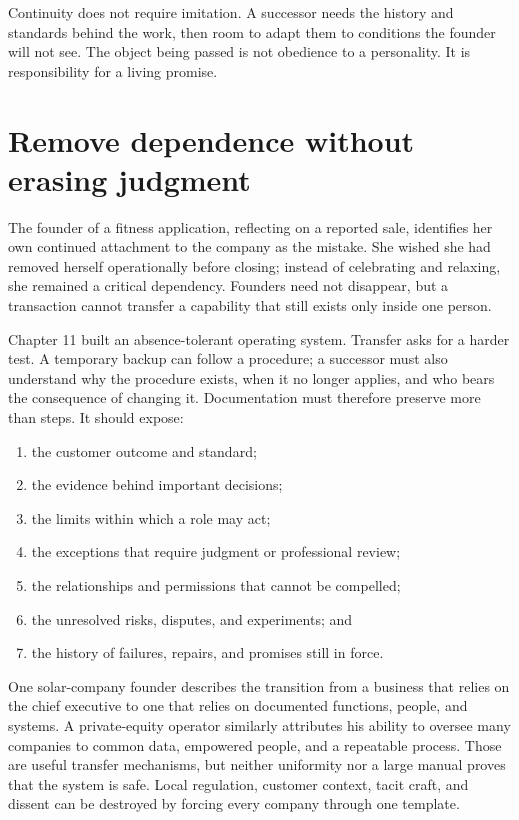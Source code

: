 Continuity does not require imitation. A successor needs the history and
standards behind the work, then room to adapt them to conditions the founder
will not see. The object being passed is not obedience to a personality. It is
responsibility for a living promise.

\section{Remove dependence without erasing judgment}

The founder of a fitness application, reflecting on a reported sale, identifies
her own continued attachment to the company as the mistake. She wished she had
removed herself operationally before closing; instead of celebrating and
relaxing, she remained a critical dependency. Founders need not disappear, but
a transaction cannot transfer a capability that still exists only inside one
person.

Chapter 11 built an absence-tolerant operating system. Transfer asks for a
harder test. A temporary backup can follow a procedure; a successor must also
understand why the procedure exists, when it no longer applies, and who bears
the consequence of changing it. Documentation must therefore preserve more
than steps. It should expose:

\begin{enumerate}[itemsep=0.12em]
\item the customer outcome and standard;
\item the evidence behind important decisions;
\item the limits within which a role may act;
\item the exceptions that require judgment or professional review;
\item the relationships and permissions that cannot be compelled;
\item the unresolved risks, disputes, and experiments; and
\item the history of failures, repairs, and promises still in force.
\end{enumerate}

One solar-company founder describes the transition from a business that relies
on the chief executive to one that relies on documented functions, people, and
systems. A private-equity operator similarly attributes his ability to oversee
many companies to common data, empowered people, and a repeatable process.
Those are useful transfer mechanisms, but neither uniformity nor a large manual
proves that the system is safe. Local regulation, customer context, tacit craft,
and dissent can be destroyed by forcing every company through one template.

